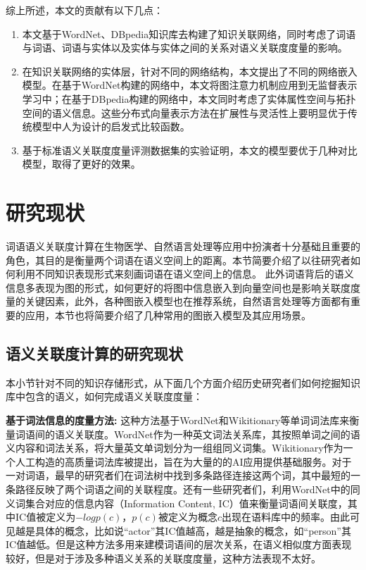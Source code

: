 \noindent 综上所述，本文的贡献有以下几点：
\begin{enumerate}
    \item 本文基于WordNet、DBpedia知识库去构建了知识关联网络，同时考虑了词语与词语、词语与实体以及实体与实体之间的关系对语义关联度度量的影响。
    \item 在知识关联网络的实体层，针对不同的网络结构，本文提出了不同的网络嵌入模型。在基于WordNet构建的网络中，本文将图注意力机制应用到无监督表示学习中；在基于DBpedia构建的网络中，本文同时考虑了实体属性空间与拓扑空间的语义信息。这些分布式向量表示方法在扩展性与灵活性上要明显优于传统模型中人为设计的启发式比较函数。
    \item 基于标准语义关联度度量评测数据集的实验证明，本文的模型要优于几种对比模型，取得了更好的效果。
\end{enumerate}

\section{研究现状}
词语语义关联度计算在生物医学、自然语言处理等应用中扮演者十分基础且重要的角色，其目的是衡量两个词语在语义空间上的距离。本节简要介绍了以往研究者如何利用不同知识表现形式来刻画词语在语义空间上的信息。
%
此外词语背后的语义信息多表现为图的形式，如何更好的将图中信息嵌入到向量空间也是影响关联度度量的关键因素，此外，各种图嵌入模型也在推荐系统，自然语言处理等方面都有重要的应用，本节也将简要介绍了几种常用的图嵌入模型及其应用场景。

\subsection{语义关联度计算的研究现状}
本小节针对不同的知识存储形式，从下面几个方面介绍历史研究者们如何挖掘知识库中包含的语义，如何完成语义关联度度量：

\textbf{基于词法信息的度量方法:}
这种方法基于WordNet和Wikitionary等单词词法库来衡量词语间的语义关联度。WordNet作为一种英文词法关系库，其按照单词之间的语义内容和词法关系，将大量英文单词划分为一组组同义词集。Wikitionary\cite{aaai/ZeschMG08}作为一个人工构造的高质量词法库被提出，旨在为大量的的AI应用提供基础服务。对于一对词语，最早的研究者们\cite{its/Rada89, Leacock98, wu1994verb, tkde/LiBM03}在词法树中找到多条路径连接这两个词，其中最短的一条路径反映了两个词语之间的关联程度。还有一些研究者们，利用WordNet中的同义词集合对应的信息内容（Information Content, IC）值来衡量词语间关联度\cite{ijcai/Resnik95, RCLIC/Jiang97, icml/Lin98}，其中IC值被定义为$-log p(c)$，$p(c)$被定义为概念$c$出现在语料库中的频率。由此可见越是具体的概念，比如说“actor”其IC值越高，越是抽象的概念，如“person”其IC值越低。但是这种方法多用来建模词语间的层次关系，在语义相似度方面表现较好，但是对于涉及多种语义关系的关联度度量，这种方法表现不太好。


